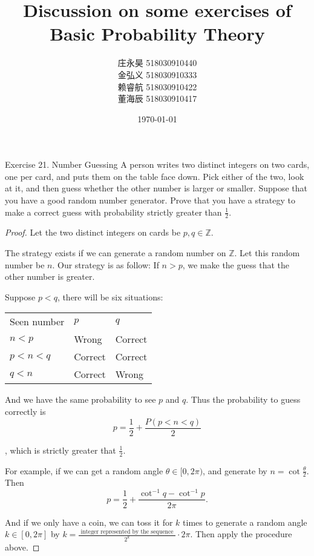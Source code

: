 \documentclass[UTF8, a4paper, linespread=1.5]{article}
\title{Discussion on some exercises of Basic Probability Theory}
\date{\today}
\author{庄永昊 518030910440 \\ 金弘义 518030910333 \\ 赖睿航 518030910422 \\ 董海辰 518030910417}
\begin{document}
\maketitle

\begin{thm}{Exercise 21. Number Guessing}{}
A person writes two distinct integers on two cards, one per card,
and puts them on the table face down. Pick either of the two, look at it, and then guess
whether the other number is larger or smaller. Suppose that you have a good random number
generator. Prove that you have a strategy to make a correct guess with probability strictly
greater than $\frac{1}{2}$.
\end{thm}

\begin{proof}[Proof]
    Let the two distinct integers on cards be $p, q \in \mathbb{Z} $.

    The strategy exists if we can generate a random number on $\mathbb{Z} $. Let this random number be $n$.
    Our strategy is as follow: If $n > p$, we make the guess that the other number is greater.

    Suppose $p < q$, there will be six situations:

    \begin{table}[h!]
        \centering
        \begin{tabular}{lll}
            Seen number   & $p$     & $q$     \\
            $n < p$         & Wrong   & Correct \\
            $p < n < q$ & Correct & Correct \\
            $q < n$     & Correct & Wrong
        \end{tabular}
    \end{table}

    And we have the same probability to see $p$ and $q$. Thus the probability to guess correctly is
    $$p = \frac{1}{2} + \frac{P(p < n < q)}{2}$$

    , which is strictly greater that $\frac{1}{2}$.

    For example, if we can get a random angle $\theta \in [0,2\pi)$, and generate by $n = \cot \frac{\theta}{2}$. Then $$p = \frac{1}{2} + \frac{\cot^{-1} q - \cot^{-1} p}{2\pi}.$$

    And if we only have a coin, we can toss it for $k$ times to generate a random angle $k \in [0, 2\pi]$ by
    $k = \frac{\text{ integer represented by the sequence }}{2^k} \cdot 2\pi$. Then apply the procedure above.
\end{proof}
\end{document}
